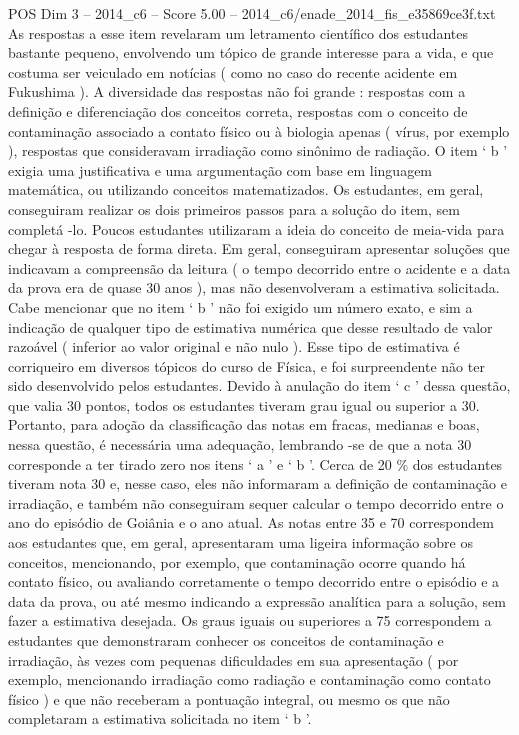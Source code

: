 \begin{textsample}{POS Dim 3 – 2014\_c6 – Score 5.00 – 2014\_c6/enade\_2014\_fis\_e35869ce3f.txt}
As respostas a esse item revelaram um letramento científico dos estudantes bastante pequeno, envolvendo um tópico de grande interesse para a vida, e que costuma ser veiculado em notícias ( como no caso do recente acidente em Fukushima ).
A diversidade das respostas não foi grande : respostas com a definição e diferenciação dos conceitos correta, respostas com o conceito de contaminação associado a contato físico ou à biologia apenas ( vírus, por exemplo ), respostas que consideravam irradiação como sinônimo de radiação.
O item ‘ b ’ exigia uma justificativa e uma argumentação com base em linguagem matemática, ou utilizando conceitos matematizados.
Os estudantes, em geral, conseguiram realizar os dois primeiros passos para a solução do item, sem completá -lo.
Poucos estudantes utilizaram a ideia do conceito de meia-vida para chegar à resposta de forma direta.
Em geral, conseguiram apresentar soluções que indicavam a compreensão da leitura ( o tempo decorrido entre o acidente e a data da prova era de quase 30 anos ), mas não desenvolveram a estimativa solicitada.
Cabe mencionar que no item ‘ b ’ não foi exigido um número exato, e sim a indicação de qualquer tipo de estimativa numérica que desse resultado de valor razoável ( inferior ao valor original e não nulo ).
Esse tipo de estimativa é corriqueiro em diversos tópicos do curso de Física, e foi surpreendente não ter sido desenvolvido pelos estudantes.
Devido à anulação do item ‘ c ’ dessa questão, que valia 30 pontos, todos os estudantes tiveram grau igual ou superior a 30.
Portanto, para adoção da classificação das notas em fracas, medianas e boas, nessa questão, é necessária uma adequação, lembrando -se de que a nota 30 corresponde a ter tirado zero nos itens ‘ a ’ e ‘ b ’.
Cerca de 20 \% dos estudantes tiveram nota 30 e, nesse caso, eles não informaram a definição de contaminação e irradiação, e também não conseguiram sequer calcular o tempo decorrido entre o ano do episódio de Goiânia e o ano atual.
As notas entre 35 e 70 correspondem aos estudantes que, em geral, apresentaram uma ligeira informação sobre os conceitos, mencionando, por exemplo, que contaminação ocorre quando há contato físico, ou avaliando corretamente o tempo decorrido entre o episódio e a data da prova, ou até mesmo indicando a expressão analítica para a solução, sem fazer a estimativa desejada.
Os graus iguais ou superiores a 75 correspondem a estudantes que demonstraram conhecer os conceitos de contaminação e irradiação, às vezes com pequenas dificuldades em sua apresentação ( por exemplo, mencionando irradiação como radiação e contaminação como contato físico ) e que não receberam a pontuação integral, ou mesmo os que não completaram a estimativa solicitada no item ‘ b ’.

\end{textsample}

